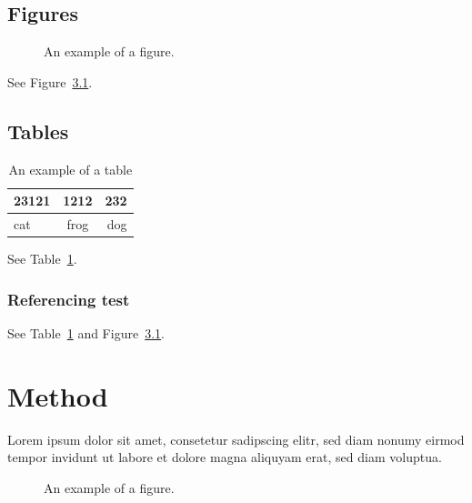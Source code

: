 \documentclass[a4paper,11pt,phdthesis,singlespace,twoside]{cssethesis}
\begin{document}
\section{Figures}
\begin{figure}[ht]
\begin{center}
\end{center}
\caption{An example of a figure.}
\label{fig:example}
\end{figure}
See Figure~\ref{fig:example}.

\section{Tables}
\begin{table}
\begin{center}
\begin{tabular}{lcr}
23121 & 1212 & 232 \\ \hline  
cat & frog & dog
\end{tabular}
\end{center}
\caption{An example of a table}
\label{tab:example}
\end{table}
See Table~\ref{tab:example}.

\subsection{Referencing test}
See Table~\ref{tab:example} and Figure~\ref{fig:example}.

\chapter{Method}
Lorem ipsum dolor sit amet, consetetur sadipscing elitr,  sed diam nonumy
eirmod tempor invidunt ut labore et dolore magna aliquyam erat, sed diam
voluptua. 

\begin{figure}[ht]
\begin{center}
\end{center}
\caption{An example of a figure.}
\label{fig:example}
\end{figure}
\end{document}
